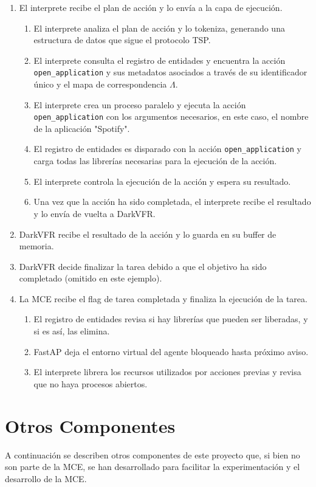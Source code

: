 \begin{enumerate}
    \item El interprete recibe el plan de acción y lo envía a la capa de ejecución.
    \begin{enumerate}
        \item El interprete analiza el plan de acción y lo tokeniza, generando una estructura de datos
        que sigue el protocolo TSP.
        \item El interprete consulta el registro de entidades y encuentra la acción \texttt{open\_application}
        y sus metadatos asociados a través de su identificador único y el mapa de correspondencia \(\Lambda\).
        \item El interprete crea un proceso paralelo y ejecuta la acción \texttt{open\_application} con los
        argumentos necesarios, en este caso, el nombre de la aplicación "Spotify".
        \item El registro de entidades es disparado con la acción \texttt{open\_application} y carga todas las librerías
        necesarias para la ejecución de la acción.
        \item El interprete controla la ejecución de la acción y espera su resultado.
        \item Una vez que la acción ha sido completada, el interprete recibe el resultado y lo envía de vuelta a DarkVFR.
    \end{enumerate}

    \item DarkVFR recibe el resultado de la acción y lo guarda en su buffer de memoria.
    \item DarkVFR decide finalizar la tarea debido a que el objetivo ha sido completado (omitido en este ejemplo).
    \item La MCE recibe el flag de tarea completada y finaliza la ejecución de la tarea.
    \begin{enumerate}
        \item El registro de entidades revisa si hay librerías que pueden ser liberadas, y si es así, las elimina.
        \item FastAP deja el entorno virtual del agente bloqueado hasta próximo aviso.
        \item El interprete librera los recursos utilizados por acciones previas y revisa que no haya procesos abiertos.
    \end{enumerate}
\end{enumerate}


\section{Otros Componentes}
A continuación se describen otros componentes de este proyecto que,
si bien no son parte de la MCE, se han desarrollado para facilitar
la experimentación y el desarrollo de la MCE.

